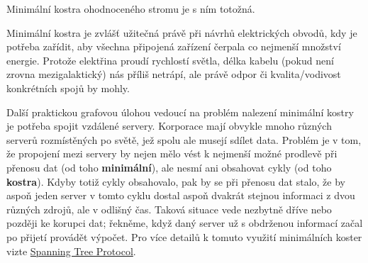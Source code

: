 \begin{corollary}
 Minimální kostra ohodnoceného stromu je s ním totožná.
\end{corollary}

Minimální kostra je zvlášť užitečná právě při návrhů elektrických obvodů, kdy je
potřeba zařídit, aby všechna připojená zařízení čerpala co nejmenší množství
energie. Protože elektřina proudí rychlostí světla, délka kabelu (pokud není
zrovna mezigalaktický) nás příliš netrápí, ale právě odpor či kvalita/vodivost
konkrétních spojů by mohly.

Další praktickou grafovou úlohou vedoucí na problém nalezení minimální kostry je
potřeba spojit vzdálené servery. Korporace mají obvykle mnoho různých serverů
rozmístěných po světě, jež spolu ale musejí sdílet data. Problém je v tom, že
propojení mezi servery by nejen mělo vést k nejmenší možné prodlevě při přenosu
dat (od toho \textbf{minimální}), ale nesmí ani obsahovat cykly (od toho
\textbf{kostra}). Kdyby totiž cykly obsahovalo, pak by se při přenosu dat stalo,
že by aspoň jeden server v tomto cyklu dostal aspoň dvakrát stejnou informaci z
dvou různých zdrojů, ale v odlišný čas. Taková situace vede nezbytně dříve nebo
později ke korupci dat; řekněme, když daný server už s obdrženou informací začal
po přijetí provádět výpočet. Pro více detailů k tomuto využití minimálních
koster vizte
\href{https://en.wikipedia.org/wiki/Spanning_Tree_Protocol}{Spanning Tree
Protocol}.
